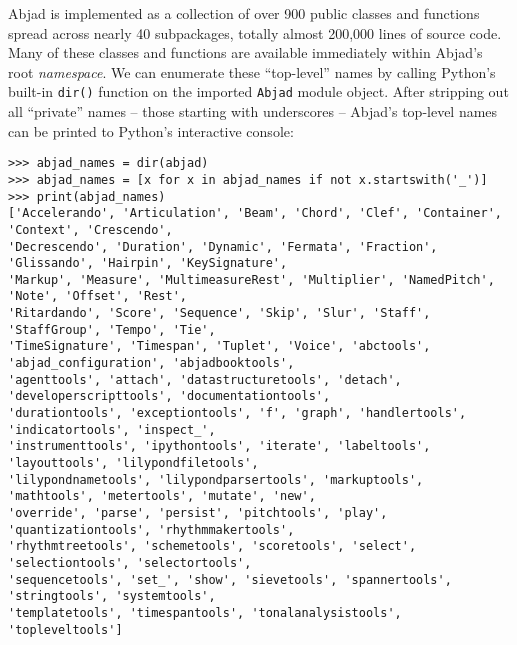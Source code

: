 \noindent Abjad is implemented as a collection of over 900 public classes and
functions spread across nearly 40 subpackages, totally almost 200,000 lines of
source code. Many of these classes and functions are available immediately
within Abjad's root \emph{namespace}. We can enumerate these
\enquote{top-level} names by calling Python's built-in \texttt{dir()} function
on the imported \texttt{Abjad} module object. After stripping out all
\enquote{private} names -- those starting with underscores -- Abjad's top-level
names can be printed to Python's interactive console:

\begin{comment}
<abjad>[text_width=105]
abjad_names = dir(abjad)
abjad_names = [x for x in abjad_names if not x.startswith('_')]
print(abjad_names)
</abjad>
\end{comment}

\begin{abjadbookoutput}
\begin{singlespacing}
\vspace{-0.5\baselineskip}
\begin{verbatim}
>>> abjad_names = dir(abjad)
>>> abjad_names = [x for x in abjad_names if not x.startswith('_')]
>>> print(abjad_names)
['Accelerando', 'Articulation', 'Beam', 'Chord', 'Clef', 'Container', 'Context', 'Crescendo',
'Decrescendo', 'Duration', 'Dynamic', 'Fermata', 'Fraction', 'Glissando', 'Hairpin', 'KeySignature',
'Markup', 'Measure', 'MultimeasureRest', 'Multiplier', 'NamedPitch', 'Note', 'Offset', 'Rest',
'Ritardando', 'Score', 'Sequence', 'Skip', 'Slur', 'Staff', 'StaffGroup', 'Tempo', 'Tie',
'TimeSignature', 'Timespan', 'Tuplet', 'Voice', 'abctools', 'abjad_configuration', 'abjadbooktools',
'agenttools', 'attach', 'datastructuretools', 'detach', 'developerscripttools', 'documentationtools',
'durationtools', 'exceptiontools', 'f', 'graph', 'handlertools', 'indicatortools', 'inspect_',
'instrumenttools', 'ipythontools', 'iterate', 'labeltools', 'layouttools', 'lilypondfiletools',
'lilypondnametools', 'lilypondparsertools', 'markuptools', 'mathtools', 'metertools', 'mutate', 'new',
'override', 'parse', 'persist', 'pitchtools', 'play', 'quantizationtools', 'rhythmmakertools',
'rhythmtreetools', 'schemetools', 'scoretools', 'select', 'selectiontools', 'selectortools',
'sequencetools', 'set_', 'show', 'sievetools', 'spannertools', 'stringtools', 'systemtools',
'templatetools', 'timespantools', 'tonalanalysistools', 'topleveltools']
\end{verbatim}
\end{singlespacing}
\end{abjadbookoutput}

